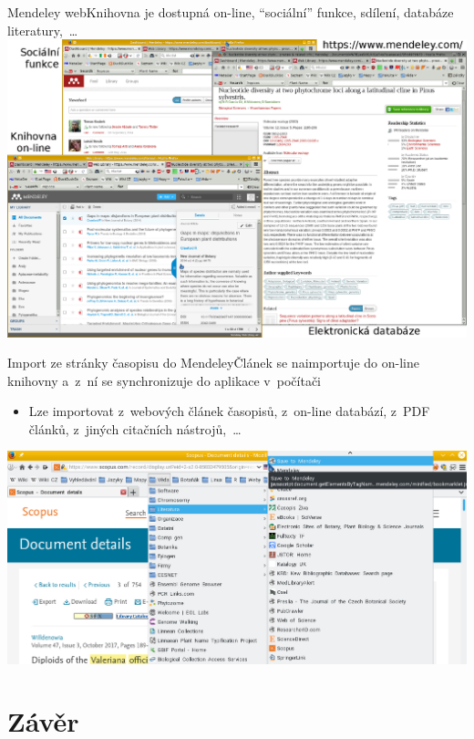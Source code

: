 \documentclass[compress, ucs, xelatex, xcolor=dvipsnames, print,
	hyperref={
		bookmarks=true,
		unicode=true,
		colorlinks=true,
		pdftitle={Citacni software},
		plainpages=false,
		pdfauthor={Vojtech Zeisek},
		pdfsubject={Kratky uvod do citacniho software},
		pdfcreator={XeLaTeX},
		pdfkeywords={citace, reference, software, literatura},
		linkcolor=Red,
		anchorcolor=Red,
		citecolor=Green,
		filecolor=Magenta,
		menucolor=Green,
		urlcolor=Cyan,
		pdftex},
	url={hyphens, lowtilde} %
	]{beamer}
\begin{document}
\begin{frame}{Mendeley web}{Knihovna je dostupná on-line, ``sociální'' funkce, sdílení, databáze literatury,~\ldots}
	\includegraphics[width=\textwidth]{mendeley_web.png}
\end{frame}

\begin{frame}{Import ze stránky časopisu do Mendeley}{Článek se naimportuje do on-line knihovny a~z~ní se synchronizuje do aplikace v~počítači}
	\begin{itemize}
		\item Lze importovat z~webových článek časopisů, z~on-line databází, z~PDF článků, z~jiných citačních nástrojů,~\ldots
	\end{itemize}
	\includegraphics[width=\textwidth]{mendeley_web_import.png}
\end{frame}

\section{Závěr}
\end{document}

